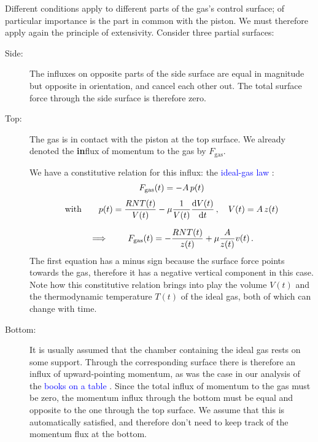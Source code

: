 \documentclass[a4paper,12pt,%
onecolumn,oneside,%
british%
]{memoir}
\newcommand*{\di}{\mathop{}\!\mathrm{d}}%
\renewcommand*{\|}[1][]{\nonscript\:#1\vert\nonscript\:\mathopen{}}
\newcommand*{\sect}{\S}%
\renewcommand*{\autoref}[3][\sect\,\ref]{\textcolor{blue}{#3}
\raisebox{0.6ex}{\color{blue}\miniscule%
\faIcon{angle-right}%
\;#1{#2}\;p.\,\pageref{#2}}}
\newcommand*{\yvis}{\mu} %
\newcommand*{\dt}{\di t}
\newcommand*{\yN}{N}
\newcommand*{\yFgas}{F_{\textrm{gas}}}
\newcommand*{\ypr}{p} %
\newcommand*{\yT}{T}%
\begin{document}
Different conditions apply to different parts of the gas's control surface; of particular importance is the part in common with the piston. We must therefore apply again the principle of extensivity. Consider three partial surfaces:
\begin{description}
\item[Side:] The influxes on opposite parts of the side surface are equal in magnitude but opposite in orientation, and cancel each other out. The total surface force through the side surface is therefore zero.

\item[Top:] The gas is in contact with the piston at the top surface. We already denoted the \textbf{in}flux of momentum to the gas by $\yFgas$.%

  We have a constitutive relation for this influx: the \autoref{def:idealgas_law}{ideal-gas law}:
  \begin{equation*}
    \begin{gathered}
      \yFgas(t) = -A\,\ypr(t)
      \\[\jot]\text{with}\qquad
      \ypr(t) = \frac{R \yN \yT(t)}{V(t)}  - \yvis \frac{1}{V(t)}\frac{\di V(t)}{\dt}
      \,,\quad
      V(t) = A\,z(t)
      \\[2\jot]
      \implies\qquad
      \yFgas(t) = -\frac{R \yN \yT(t)}{z(t)}  + \yvis \frac{A}{z(t)} v(t) \,.
    \end{gathered}
  \end{equation*}
  The first equation has a minus sign because the surface force points towards the gas, therefore it has a negative vertical component in this case. Note how this constitutive relation brings into play the volume $V(t)$ and the thermodynamic temperature $\yT(t)$ of the ideal gas, both of which can change with time.

\item[Bottom:] It is usually assumed that the chamber containing the ideal gas rests on some support. Through the corresponding surface there is therefore an influx of upward-pointing momentum, as was the case in our analysis of the \autoref{sec:bal_momentum_statics}{books on a table}. Since the total influx of momentum to the gas must be zero, the momentum influx through the bottom must be equal and opposite to the one through the top surface. We assume that this is automatically satisfied, and therefore don't need to keep track of the momentum flux at the bottom.
\end{description}
\end{document}
